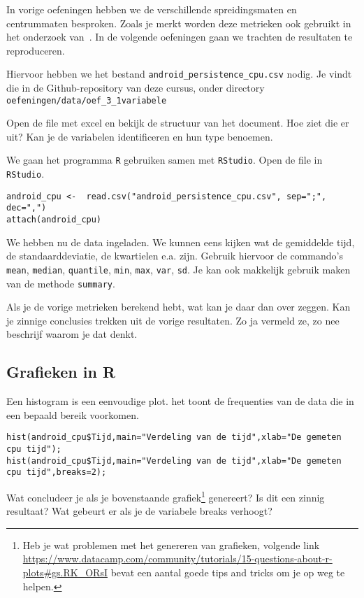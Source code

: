 In vorige oefeningen hebben we de verschillende spreidingsmaten en centrummaten besproken. Zoals je merkt worden deze metrieken ook gebruikt in het onderzoek van~\textcite{Akin2016}. In de volgende oefeningen gaan we trachten de resultaten te reproduceren.

Hiervoor hebben we het bestand \texttt{android\_persistence\_cpu.csv} nodig. Je vindt die in de Github-repository van deze cursus, onder directory \texttt{oefeningen/data/oef\_3\_1variabele}

\begin{exercise}
  \label{oef:casus-akin2016-1var}
	Open de file met excel en bekijk de structuur van het document. Hoe ziet die er uit? Kan je de variabelen identificeren en hun type benoemen. 
\end{exercise}

We gaan het programma \texttt{R} gebruiken samen met \texttt{RStudio}. Open de file in \texttt{RStudio}.

\begin{lstlisting}
android_cpu <-  read.csv("android_persistence_cpu.csv", sep=";", dec=",")
attach(android_cpu)
\end{lstlisting}

We hebben nu de data ingeladen. We kunnen eens kijken wat de gemiddelde tijd, de standaarddeviatie, de kwartielen e.a. zijn. Gebruik hiervoor de commando's \texttt{mean}, \texttt{median}, \texttt{quantile}, \texttt{min}, \texttt{max}, \texttt{var}, \texttt{sd}. Je kan ook makkelijk gebruik maken van de methode \texttt{summary}.

\begin{exercise}
	Als je de vorige metrieken berekend hebt, wat kan je daar dan over zeggen. Kan je zinnige conclusies trekken uit de vorige resultaten. Zo ja vermeld ze, zo nee beschrijf waarom je dat denkt.
\end{exercise}

\subsection{Grafieken in R}

Een histogram is een eenvoudige plot. het toont de frequenties van de data die in een bepaald bereik voorkomen. 

\begin{lstlisting}
hist(android_cpu$Tijd,main="Verdeling van de tijd",xlab="De gemeten cpu tijd");
hist(android_cpu$Tijd,main="Verdeling van de tijd",xlab="De gemeten cpu tijd",breaks=2);
\end{lstlisting}
\begin{exercise}
	Wat concludeer je als je bovenstaande grafiek\footnote{Heb je wat problemen met het genereren van grafieken, volgende link \url{https://www.datacamp.com/community/tutorials/15-questions-about-r-plots\#gs.RK_ORsI} bevat een aantal goede tips and tricks om je op weg te helpen.} genereert? Is dit een zinnig resultaat? Wat gebeurt er als je de variabele breaks verhoogt?
\end{exercise}

